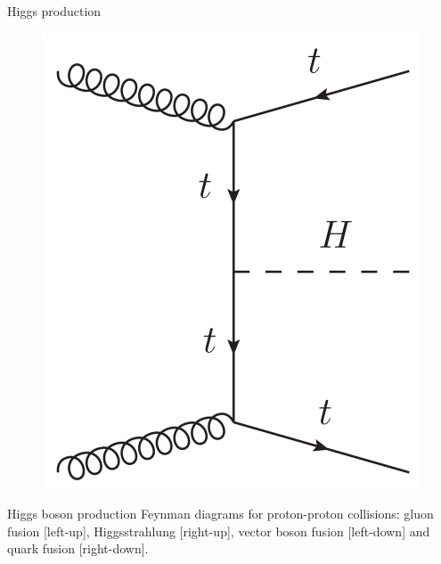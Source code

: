 \begin{frame}{Higgs production}
\begin{figure}[!Hhtbp]
\begin{center}
    \includegraphics[scale=0.3]{../figs/QuarkF_H.png}
  \end{center}
\end{figure}

\vspace{-.2cm}
    \begin{block}{}
      \tiny \centering Higgs boson production Feynman diagrams for proton-proton collisions: gluon fusion [left-up], Higgsstrahlung [right-up], vector boson fusion [left-down] and quark fusion [right-down].
    \end{block}

\end{frame}

